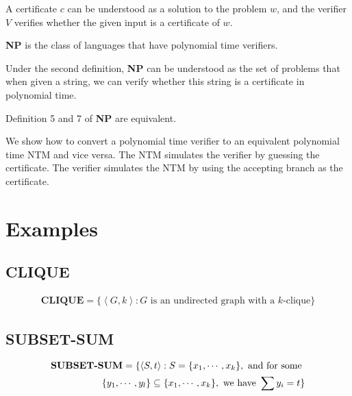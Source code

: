 \begin{intuition}
    A certificate $c$ can be understood as a solution to the problem $w$, and the verifier $V$ verifies whether the given input is a certificate of $w$.
\end{intuition}

\begin{definition}[NP]
\textbf{NP} is the class of languages that have polynomial time verifiers.
\end{definition}

\begin{intuition}
    Under the second definition, \textbf{NP} can be understood as the set of problems that when given a string, we can verify whether this string is a certificate in polynomial time.
\end{intuition}

\begin{theorem}
Definition 5 and 7 of \textbf{NP} are equivalent.
\end{theorem}
\begin{proofidea}
    We show how to convert a polynomial time verifier to an equivalent polynomial time NTM and vice versa. The NTM simulates the verifier by guessing the certificate. The verifier simulates the NTM by using the accepting branch as the certificate.
\end{proofidea}

\section{Examples} \label{sec:}
\subsection{CLIQUE} \label{sec:}

\begin{align}
    \mathbf{CLIQUE} = \{ \left<G,k \right> : G \text{ is an undirected graph with a }k\text{-clique} \}
\end{align}

\subsection{SUBSET-SUM} \label{sec:}

\begin{align}
    \text{\textbf{SUBSET-SUM}} = \{ \left<S,t \right> : S = \{ x_1,\cdots ,x_k \}, \text{ and for some } \notag\\\{ y_1,\cdots ,y_l \} \subseteq \{ x_1,\cdots ,x_k \}, \text{ we have } \sum_{}y_i = t\}
\end{align}

